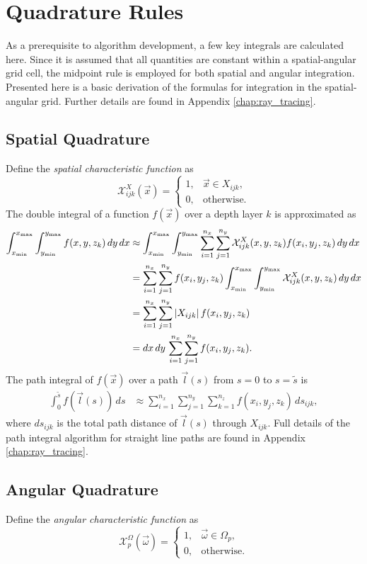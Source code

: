 \section{Quadrature Rules}
As a prerequisite to algorithm development, a few key integrals are calculated here.
Since it is assumed that all quantities are constant within a spatial-angular grid cell,
the midpoint rule is employed for both spatial and angular integration.
Presented here is a basic derivation of the formulas for integration in the spatial-angular grid.
Further details are found in Appendix \ref{chap:ray_tracing}.

\subsection{Spatial Quadrature}
Define the \textit{spatial characteristic function} as
\begin{equation*}
  \mathcal{X}^X_{ijk}(\vec{x}) = \begin{cases}
    1, & \vec{x} \in X_{ijk}, \\
    0, & \mbox{otherwise}.
  \end{cases}
\end{equation*}
The double integral of a function $f(\vec{x})$ over a depth layer $k$ is approximated as
\begin{align*}
  \int_{x_{\min}}^{x_{\max}}\int_{y_{\min}}^{y_{\max}} f(x, y, z_k)\, dy\, dx &\approx \int_{x_{\min}}^{x_{\max}} \int_{y_{\min}}^{y_{\max}} \sum_{i=1}^{n_x}\sum_{j=1}^{n_y} \mathcal{X}^X_{ijk}(x,y,z_k) f(x_i, y_j, z_k)\, dy\, dx \\
  &= \sum_{i=1}^{n_x}\sum_{j=1}^{n_y} f(x_i, y_j, z_k) \int_{x_{\min}}^{x_{\max}} \int_{y_{\min}}^{y_{\max}} \mathcal{X}^X_{ijk}(x,y,z_k) \, dy\, dx \\
  &= \sum_{i=1}^{n_x}\sum_{j=1}^{n_y} \left| X_{ijk} \right| f(x_i, y_j, z_k) \\
  &= dx\, dy\, \sum_{i=1}^{n_x}\sum_{j=1}^{n_y} f(x_i, y_j, z_k).
\end{align*}
The path integral of $f(\vec{x})$ over a path $\vec{l}(s)$ from $s=0$ to $s=\tilde{s}$ is
\begin{align*}
  \int_0^{\tilde{s}} f(\vec{l}(s))\, ds &\approx \sum_{i=1}^{n_x}\sum_{j=1}^{n_y}\sum_{k=1}^{n_z} f(x_i, y_j, z_k)\, ds_{ijk},
\end{align*}
where $ds_{ijk}$ is the total path distance of $\vec{l}(s)$ through $X_{ijk}$.
Full details of the path integral algorithm for straight line paths are found in Appendix \ref{chap:ray_tracing}.

\subsection{Angular Quadrature}
Define the \textit{angular characteristic function} as
\begin{equation*}
  \mathcal{X}^\Omega_p(\vec{\omega}) = \begin{cases}
    1, & \vec{\omega} \in \Omega_p, \\
    0, & \mbox{otherwise}.
  \end{cases}
\end{equation*}


